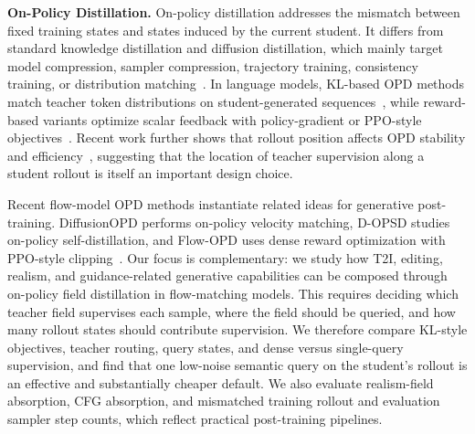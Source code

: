 \noindent\textbf{On-Policy Distillation.}
On-policy distillation addresses the mismatch between fixed training states and states induced by the current student. It differs from standard knowledge distillation and diffusion distillation, which mainly target model compression, sampler compression, trajectory training, consistency training, or distribution matching~\cite{hinton2015distilling,salimans2022progressive,song2023consistency,luo2023latent,yin2024one,sauer2024fast,kim2024consistency}. In language models, KL-based OPD methods match teacher token distributions on student-generated sequences~\cite{gu2024minillm,agarwal2024policy,jia2026asymmetric}, while reward-based variants optimize scalar feedback with policy-gradient or PPO-style objectives~\cite{yang2026learning,luo2026demystifying,fang2026rubric}. Recent work further shows that rollout position affects OPD stability and efficiency~\cite{ziheng2026moreearlystoppingrollout,kong2026ai}, suggesting that the location of teacher supervision along a student rollout is itself an important design choice.

Recent flow-model OPD methods instantiate related ideas for generative post-training. DiffusionOPD performs on-policy velocity matching, D-OPSD studies on-policy self-distillation, and Flow-OPD uses dense reward optimization with PPO-style clipping~\cite{li2026diffusionopd,jiang2026d,fang2026flow}. Our focus is complementary: we study how T2I, editing, realism, and guidance-related generative capabilities can be composed through on-policy field distillation in flow-matching models. This requires deciding which teacher field supervises each sample, where the field should be queried, and how many rollout states should contribute supervision. We therefore compare KL-style objectives, teacher routing, query states, and dense versus single-query supervision, and find that one low-noise semantic query on the student's rollout is an effective and substantially cheaper default. We also evaluate realism-field absorption, CFG absorption, and mismatched training rollout and evaluation sampler step counts, which reflect practical post-training pipelines.


